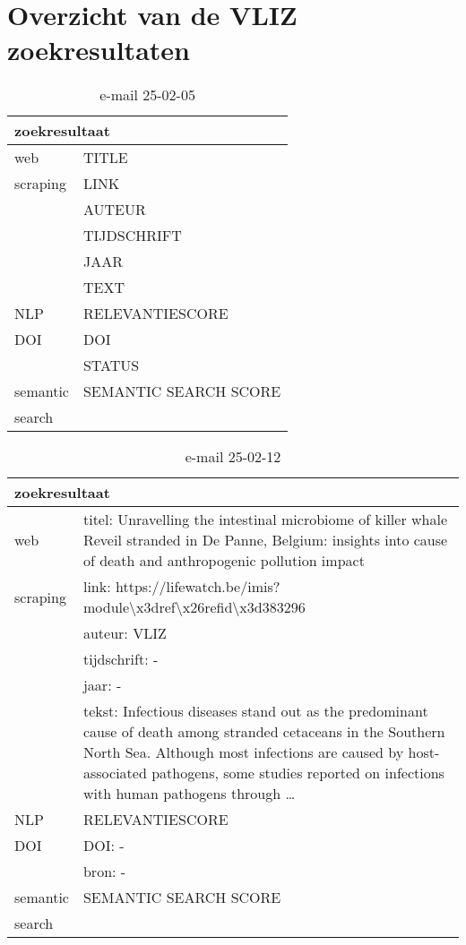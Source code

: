 \section{Overzicht van de VLIZ zoekresultaten}
\begin{table}[h!]
    \caption{e-mail 25-02-05}
    \centering
    \begin{tabularx}{\textwidth}{|p{4cm}|X|} 
        \hline
        \multicolumn{2}{|X|}{\textbf{zoekresultaat}} \\
        \hline
        web &TITLE\\
        scraping&LINK\\
        &AUTEUR\\
        &TIJDSCHRIFT\\
        &JAAR\\
        &TEXT\\
        \hline
        NLP&RELEVANTIESCORE\\
        \hline
        DOI&DOI\\
        &STATUS\\
        \hline
        semantic&SEMANTIC SEARCH SCORE\\
        search&\\
        \hline
    \end{tabularx}
    \label{table:email20250205}
\end{table}
\begin{table}[h!]
    \caption{e-mail 25-02-12}
    \centering
    \begin{tabularx}{\textwidth}{|p{4cm}|X|} 
        \hline
        \multicolumn{2}{|X|}{\textbf{zoekresultaat}} \\
        \hline
        web &titel: Unravelling the intestinal microbiome of killer whale Reveil stranded in De Panne, Belgium: insights into cause of death and anthropogenic pollution impact\\
        scraping&link: https://lifewatch.be/imis?module\textbackslash x3dref\textbackslash x26refid\textbackslash x3d383296\\
        &auteur: VLIZ\\
        &tijdschrift: -\\
        &jaar: -\\
        &tekst: Infectious diseases stand out as the predominant cause of death among stranded cetaceans in the Southern North Sea. Although most infections are caused by host-associated pathogens, some studies reported on infections with human pathogens through …\\
        \hline
        NLP&RELEVANTIESCORE\\
        \hline
        DOI&DOI: -\\
        &bron: -\\
        \hline
        semantic&SEMANTIC SEARCH SCORE\\
        search&\\
        \hline
    \end{tabularx}
    \label{table:email20250212}
\end{table}
